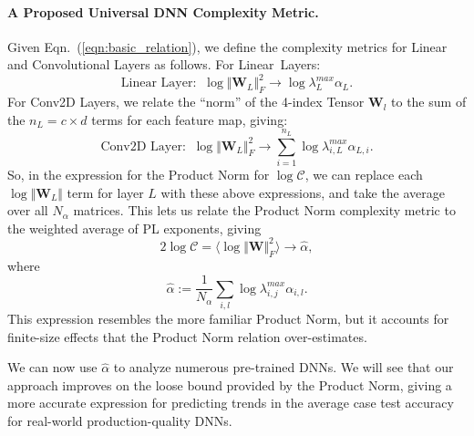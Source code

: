 \paragraph{A Proposed Universal DNN Complexity Metric.} 

Given Eqn.~(\ref{eqn:basic_relation}), we define the complexity metrics for Linear and Convolutional Layers as follows.
For Linear~Layers:
$$
\text{Linear Layer:}\;\;\log\Vert\mathbf{W}_{L}\Vert^{2}_{F}\rightarrow\log\lambda^{max}_{L}\alpha_{L}  .
$$
For Conv2D Layers, we relate the ``norm'' of the 4-index Tensor $\mathbf{W}_{l}$ to the sum of the $n_{L}=c\times d$ terms for each feature map, giving: 
$$
\text{Conv2D Layer:}\;\;\log\Vert\mathbf{W}_{L}\Vert^{2}_{F}\rightarrow \sum_{i=1}^{n_{L}}\log\lambda^{max}_{i,L}\alpha_{L,i}  .
$$
So, in the expression for the Product Norm for $\log\mathcal{C}$, we can replace each $\log\Vert\mathbf{W}_{L}\Vert$ term for layer $L$ with these above expressions, and take the average over all $N_{\alpha}$  matrices.  This lets us relate the Product Norm complexity metric to the weighted average of PL exponents, giving
$$
2\log\mathcal{C}=\langle\log\Vert\mathbf{W}\Vert^{2}_{F}\rangle\rightarrow\hat{\alpha}  ,
$$ 
where
\begin{equation}
\hat{\alpha}:=\dfrac{1}{N_{\alpha}}\sum_{i,l}\log\lambda^{max}_{i,j}\alpha_{i,l}  .
\label{eqn:alpha_hat_specific}
\end{equation}
This expression resembles the more familiar Product Norm, but it accounts for finite-size effects that the Product Norm relation over-estimates.

We can now use $\hat{\alpha}$ to analyze numerous pre-trained DNNs.
We will see that our approach improves on the loose bound provided by the Product Norm, giving a more accurate expression for predicting trends in the average case test accuracy for real-world production-quality DNNs.


